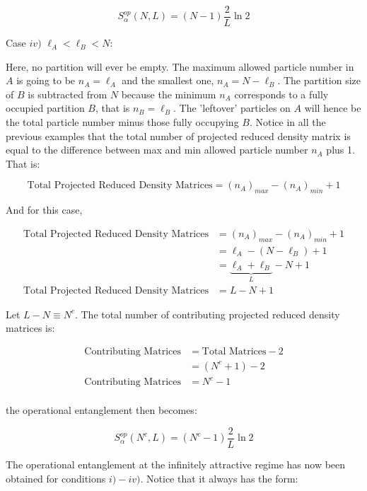\begin{equation}
S_{\alpha}^{op} (N, L) = (N - 1) \frac{2}{L} \ln{2}
\end{equation}

Case $iv)$ $\ell_{A} < \ell_{B} < N$:

Here, no partition will ever be empty. The maximum allowed particle number in $A$ is going to be $n_{A} = \ell_{A}$ and the smallest one, $n_{A} = N - \ell_{B}$. The partition size of $B$ is subtracted from $N$ because the minimum $n_A$ corresponds to a fully occupied partition $B$, that is $n_B = \ell_B$. The 'leftover' particles on $A$ will hence be the total particle number minus those fully occupying $B$. Notice in all the previous examples that the total number of projected reduced density matrix is equal to the difference between max and min allowed particle number $n_A$ plus 1. That is:

\begin{equation}
\text{Total Projected Reduced Density Matrices} = (n_A)_{max} - (n_A)_{min} + 1
\end{equation}

And for this case,

 \begin{align}
\text{Total Projected Reduced Density Matrices} &= (n_A)_{max} - (n_A)_{min} + 1 \\
&= \ell_A - (N-\ell_B) + 1 \\
&= \underbrace{\ell_A + \ell_B}_{L} - N + 1 \\
\text{Total Projected Reduced Density Matrices} &= L - N + 1
\end{align}

Let $L-N \equiv N^c$. The total number of contributing projected reduced density matrices is:

\begin{align}
\text{Contributing Matrices} &= \text{Total Matrices} - 2 \\
&= (N^c + 1) - 2 \\
\text{Contributing Matrices} &= N^c - 1 \\
\end{align}

the operational entanglement then becomes:

\begin{equation}
S_\alpha^{op}(N^c,L) = (N^c - 1) \frac{2}{L} \ln{2}
\end{equation}

The operational entanglement at the infinitely attractive regime has now been obtained for conditions $i)-iv)$. Notice that it always has the form:

